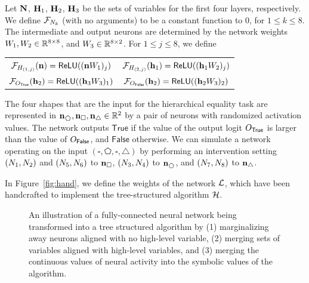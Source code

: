 \documentclass[twoside,11pt]{article}
\begin{document}
Let $\mathbf{N}$, $\mathbf{H}_1$, $\mathbf{H}_2$, $\mathbf{H}_3$ be the sets of variables for the first four layers, respectively. We define $\mathcal{F}_{N_k}$ (with no arguments) to be a constant function to $0$, for $1 \leq k \leq 8$. The intermediate and output neurons are determined by the network weights $W_{1},W_2 \in \mathbb{R}^{8\times8}$, and ${W}_3 \in \mathbb{R}^{8\times2}$.  For $1 \leq j \leq 8$, we define 
\begin{center}
\begin{tabular}{c c}
$\mathcal{F}_{H_{(1,j)}}(\mathbf{n}) = \mathsf{ReLU}((\mathbf{n} W_1)_j)$ & $\mathcal{F}_{H_{(2,j)}}(\mathbf{h}_1) = \mathsf{ReLU}((\mathbf{h}_1W_2)_j)$ \\
$\mathcal{F}_{O_{\mathsf{True}}}(\mathbf{h}_2) = \mathsf{ReLU}((\mathbf{h}_3{W}_3)_1)$ & $\mathcal{F}_{O_{\mathsf{False}}}(\mathbf{h}_2) = \mathsf{ReLU}((\mathbf{h}_2W_3)_2)$\\
\end{tabular}
\end{center}

The four shapes that are the input for the hierarchical equality task are represented in $\inneuronset_{\pentagon}, \inneuronset_{\square}, \inneuronset_{\bigtriangleup} \in \mathbb{R}^2$ by a pair of neurons with randomized activation values. The network outputs $\mathsf{True}$ if the value of the output logit $O_{\mathsf{True}}$ is larger than the value of $O_{\mathsf{False}}$, and $\mathsf{False}$ otherwise. We can simulate a network operating on the input $(\square, \pentagon, \square, \bigtriangleup)$ by performing an intervention setting $(N_1, N_2)$ and $(N_5,N_6)$ to $\mathbf{n}_{\square}$, $(N_3, N_4)$ to $\inneuronset_{\pentagon}$, and $(N_7,N_8)$ to $\mathbf{n}_{\bigtriangleup}$. 

In Figure~\ref{fig:hand}, we define the weights of the network $\mathcal{L}$, which have been handcrafted to implement the tree-structured algorithm $\mathcal{H}$. 
\begin{figure}[tp]
\hspace{3em}


\caption{An illustration of a fully-connected neural network being transformed into a tree structured algorithm by (1) marginalizing away neurons aligned with no high-level variable, (2) merging sets of variables aligned with high-level variables, and (3) merging the continuous values of neural activity into the symbolic values of the algorithm.}
\label{fig:constructive}
\end{figure}
\end{document}

